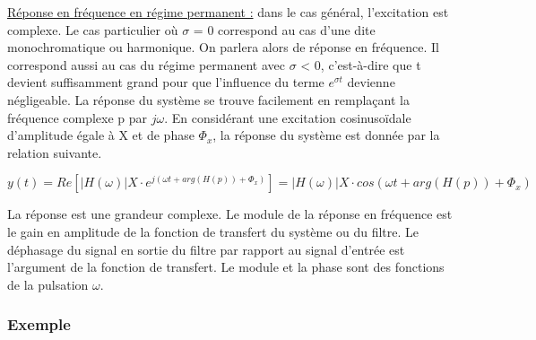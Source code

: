 \documentclass[]{report}
\begin{document}
	\vspace{1\baselineskip}
	
	
	\underline{Réponse en fréquence en régime permanent :} 
	dans le cas général, l'excitation est complexe. Le cas particulier où $\sigma$ = 0 correspond au cas d'une dite monochromatique ou harmonique. On parlera alors de réponse en fréquence. Il correspond aussi au cas du régime permanent avec $\sigma$ < 0, c'est-à-dire que t devient suffisamment grand pour que l'influence du terme $e^{\sigma t}$ devienne négligeable. 
	La réponse du système se trouve facilement en remplaçant la fréquence complexe p par $j\omega$. En considérant une excitation cosinusoïdale d'amplitude égale à X et de phase $\Phi_{x}$, la réponse du système est donnée par la relation suivante.
	
	\begin{equation}\label{calcul_reponse_fonction_transfert}
	y(t) = Re[|H(\omega)|X\cdot e^{j(\omega t+arg(H(p))+\Phi_{x})}] =|H(\omega)|X\cdot cos(\omega t+arg(H(p))+\Phi_{x})
	\end{equation}
	
	La réponse est une grandeur complexe. Le module de la réponse en fréquence est le gain en amplitude de la fonction de transfert du système ou du filtre. Le déphasage du signal en sortie du filtre par rapport au signal d'entrée est l'argument de la fonction de transfert. Le module et la phase sont des fonctions de la pulsation $\omega$.
	
	
	\subsubsection{Exemple}
	
\end{document}
